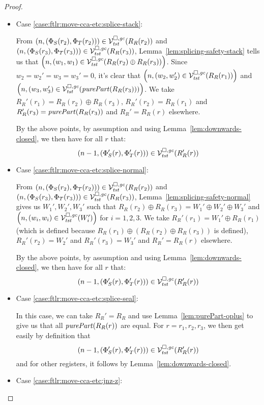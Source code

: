 \begin{proof}
\begin{itemize}
  \item Case \ref{case:ftlr:move-cca-etc:splice-stack}:

    From $\npair{(\Phi_S(r_2),\Phi_T(r_2))} \in \lrvg{\trust}(R_R(r_2))$ and $\npair{(\Phi_S(r_3),\Phi_T(r_3))} \in \lrvg{\trust}(R_R(r_3))$, Lemma~\ref{lem:splicing-safety-stack} tells us that $\npair{(w_1,w_1) \in \lrvg{\trust}(R_R(r_2)\oplus R_R(r_3))}$.
    Since $w_2 = w_2'=w_3=w_3'=0$, it's clear that 
    $\npair{(w_2,w_2') \in \lrvg{\trust}(R_R(r_1))}$ and $\npair{(w_3,w_3') \in \lrvg{\trust}(\purePart{R_R(r_3)})}$.
    We take $R_R'(r_1) = R_R(r_2)\oplus R_R(r_3)$, $R_R'(r_2) = R_R(r_1)$ and $R_R'(r_3) = \purePart{R_R(r_3)}$ and $R_R' = R_R(r)$ elsewhere.

    By the above points, by assumption and using Lemma~\ref{lem:downwards-closed}, we then have for all $r$ that:
    \[
      \npair[n-1]{(\Phi_S'(r), \Phi_T'(r))} \in \lrvg{\trust}(R_R'(r))
    \]

  \item Case \ref{case:ftlr:move-cca-etc:splice-normal}:

    From $\npair{(\Phi_S(r_2),\Phi_T(r_2))} \in \lrvg{\trust}(R_R(r_2))$ and $\npair{(\Phi_S(r_3),\Phi_T(r_3))} \in \lrvg{\trust}(R_R(r_3))$, Lemma~\ref{lem:splicing-safety-normal} gives us $W_1',W_2',W_3'$ such that $R_R(r_2)\oplus R_R(r_3) = W_1'\oplus W_2' \oplus W_3'$ and
    $\npair{(w_i,w_i) \in \lrvg{\trust}(W_i')}$ for $i = 1,2,3$.
    We take $R_R'(r_1) = W_1'\oplus R_R(r_1)$ (which is defined because $R_R(r_1) \oplus (R_R(r_2)\oplus R_R(r_3))$ is defined), $R_R'(r_2) = W_2'$ and $R_R'(r_3) = W_3'$ and $R_R' = R_R(r)$ elsewhere.

    By the above points, by assumption and using Lemma~\ref{lem:downwards-closed}, we then have for all $r$ that:
    \[
      \npair[n-1]{(\Phi_S'(r), \Phi_T'(r))} \in \lrvg{\trust}(R_R'(r))
    \]

  \item Case \ref{case:ftlr:move-cca-etc:splice-seal}:

    In this case, we can take $R_R' = R_R$ and use Lemma~\ref{lem:purePart-oplus} to give us that all $\purePart{R_R(r)}$ are equal.
    For $r = r_1, r_2, r_3$, we then get easily by definition that
    \[
      \npair[n-1]{(\Phi_S'(r), \Phi_T'(r))} \in \lrvg{\trust}(R_R'(r))
    \]
    and for other registers, it follows by Lemma~\ref{lem:downwards-closed}.

  \item Case \ref{case:ftlr:move-cca-etc:jnz-z}:


\end{itemize}
\end{proof}
